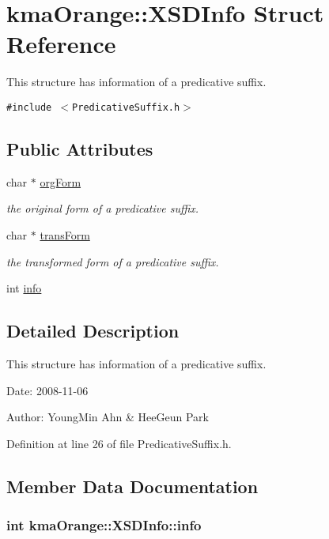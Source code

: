 \hypertarget{structkmaOrange_1_1XSDInfo}{
\section{kmaOrange::XSDInfo Struct Reference}
\label{structkmaOrange_1_1XSDInfo}
}
This structure has information of a predicative suffix.  


{\tt \#include $<$PredicativeSuffix.h$>$}

\subsection*{Public Attributes}
\begin{CompactItemize}
\item 
char $\ast$ \hyperlink{structkmaOrange_1_1XSDInfo_912ec5d6c99a11aaede8b72f97d2ba62}{orgForm}
\begin{CompactList}\small\item\em the original form of a predicative suffix. \item\end{CompactList}\item 
char $\ast$ \hyperlink{structkmaOrange_1_1XSDInfo_92de5b4d034c3cbb56c2ba6eb5d2eba9}{transForm}
\begin{CompactList}\small\item\em the transformed form of a predicative suffix. \item\end{CompactList}\item 
int \hyperlink{structkmaOrange_1_1XSDInfo_cf302279a468244d92ba2abe6c2ead99}{info}
\end{CompactItemize}


\subsection{Detailed Description}
This structure has information of a predicative suffix. 

\begin{Desc}
\item[Date:]2008-11-06 \end{Desc}
\begin{Desc}
\item[Author:]YoungMin Ahn \& HeeGeun Park \end{Desc}


Definition at line 26 of file PredicativeSuffix.h.

\subsection{Member Data Documentation}
\hypertarget{structkmaOrange_1_1XSDInfo_cf302279a468244d92ba2abe6c2ead99}{
\subsubsection[{info}]{\setlength{\rightskip}{0pt plus 5cm}int {\bf kmaOrange::XSDInfo::info}}}
\label{structkmaOrange_1_1XSDInfo_cf302279a468244d92ba2abe6c2ead99}





